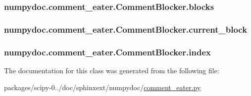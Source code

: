 \subsubsection[{blocks}]{\setlength{\rightskip}{0pt plus 5cm}numpydoc.\+comment\+\_\+eater.\+Comment\+Blocker.\+blocks}\label{classnumpydoc_1_1comment__eater_1_1CommentBlocker_abf577cea7e1b8082f11a82ac1db2bca6}
\hypertarget{classnumpydoc_1_1comment__eater_1_1CommentBlocker_abc0a2b69a451947db141aaef7800f32e}{}
\subsubsection[{current\+\_\+block}]{\setlength{\rightskip}{0pt plus 5cm}numpydoc.\+comment\+\_\+eater.\+Comment\+Blocker.\+current\+\_\+block}\label{classnumpydoc_1_1comment__eater_1_1CommentBlocker_abc0a2b69a451947db141aaef7800f32e}
\hypertarget{classnumpydoc_1_1comment__eater_1_1CommentBlocker_a3ffc9c07e4162abb983ab4786e4b8580}{}
\subsubsection[{index}]{\setlength{\rightskip}{0pt plus 5cm}numpydoc.\+comment\+\_\+eater.\+Comment\+Blocker.\+index}\label{classnumpydoc_1_1comment__eater_1_1CommentBlocker_a3ffc9c07e4162abb983ab4786e4b8580}


The documentation for this class was generated from the following file\+:\begin{DoxyCompactItemize}
\item 
packages/scipy-\/0../doc/sphinxext/numpydoc/\hyperlink{comment__eater_8py}{comment\+\_\+eater.\+py}\end{DoxyCompactItemize}
